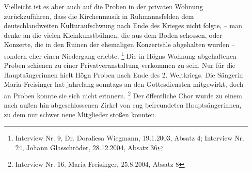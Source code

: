 Vielleicht ist es aber auch auf die Proben in der privaten Wohnung
zurückzuführen, dass die Kirchenmusik in Ruhmannsfelden dem
deutschlandweiten Kulturaufschwung nach Ende des Krieges nicht folgte,
– man denke an die vielen Kleinkunstbühnen, die aus dem Boden schossen,
oder Konzerte, die in den Ruinen der ehemaligen Konzertsäle abgehalten
wurden – sondern eher einen Niedergang erlebte. \footnote{Interview Nr.
9, Dr. Doraliesa Wiegmann, 19.1.2003, Absatz 4; Interview Nr. 24,
Johann Glasschröder, 28.12.2004, Absatz 36} Die in Högns Wohnung
abgehaltenen Proben schienen zu einer Privatveranstaltung verkommen zu
sein. Nur für die Hauptsängerinnen hielt Högn Proben nach Ende des 2.
Weltkriegs. Die Sängerin Maria Freisinger hat jahrelang sonntags an den
Gottesdiensten mitgewirkt, doch an Proben konnte sie sich nicht
erinnern. \footnote{Interview Nr. 16, Maria Freisinger, 25.8.2004,
Absatz 8} Der öffentliche Chor wurde zu einem nach außen hin
abgeschlossenen Zirkel von eng befreundeten Hauptsängerinnen, zu dem
nur schwer neue Mitglieder stoßen konnten.

